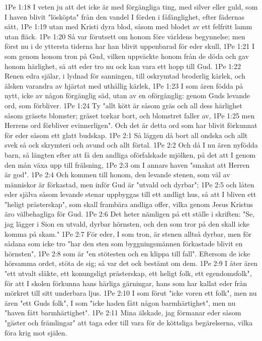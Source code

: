 1Pe 1:18  I veten ju att det icke är med förgängliga ting, med silver eller guld, som I haven blivit "lösköpta" från den vandel I förden i fåfänglighet, efter fädernas sätt,
1Pe 1:19  utan med Kristi dyra blod, såsom med blodet av ett felfritt lamm utan fläck.
1Pe 1:20  Så var förutsett om honom före världens begynnelse; men först nu i de yttersta tiderna har han blivit uppenbarad för eder skull,
1Pe 1:21  I som genom honom tron på Gud, vilken uppväckte honom från de döda och gav honom härlighet, så att eder tro nu ock kan vara ett hopp till Gud.
1Pe 1:22  Renen edra själar, i lydnad för sanningen, till oskrymtad broderlig kärlek, och älsken varandra av hjärtat med uthållig kärlek,
1Pe 1:23  I som ären födda på nytt, icke av någon förgänglig säd, utan av en oförgänglig: genom Guds levande ord, som förbliver.
1Pe 1:24  Ty "allt kött är såsom gräs och all dess härlighet såsom gräsets blomster; gräset torkar bort, och blomstret faller av,
1Pe 1:25  men Herrens ord förbliver evinnerligen". Och det är detta ord som har blivit förkunnat för eder såsom ett glatt budskap.
1Pe 2:1  Så läggen då bort all ondska och allt svek så ock skrymteri och avund och allt förtal.
1Pe 2:2  Och då I nu ären nyfödda barn, så längten efter att få den andliga oförfalskade mjölken, på det att I genom den mån växa upp till frälsning,
1Pe 2:3  om I annars haven "smakat att Herren är god".
1Pe 2:4  Och kommen till honom, den levande stenen, som väl av människor är förkastad, men inför Gud är "utvald och dyrbar";
1Pe 2:5  och låten eder själva såsom levande stenar uppbyggas till ett andligt hus, så att I bliven ett "heligt prästerskap", som skall frambära andliga offer, vilka genom Jesus Kristus äro välbehagliga för Gud.
1Pe 2:6  Det heter nämligen på ett ställe i skriften: "Se, jag lägger i Sion en utvald, dyrbar hörnsten, och den som tror på den skall icke komma på skam."
1Pe 2:7  För eder, I som tron, är stenen alltså dyrbar, men för sådana som icke tro "har den sten som byggningsmännen förkastade blivit en hörnsten",
1Pe 2:8  som är "en stötesten och en klippa till fall". Eftersom de icke hörsamma ordet, stöta de sig; så var det ock bestämt om dem.
1Pe 2:9  I åter ären "ett utvalt släkte, ett konungsligt prästerskap, ett heligt folk, ett egendomsfolk", för att I skolen förkunna hans härliga gärningar, hans som har kallat eder från mörkret till sitt underbara ljus.
1Pe 2:10  I som förut "icke voren ett folk", men nu ären "ett Guds folk", I som "icke haden fått någon barmhärtighet", men nu "haven fått barmhärtighet".
1Pe 2:11  Mina älskade, jag förmanar eder såsom "gäster och främlingar" att taga eder till vara för de köttsliga begärelserna, vilka föra krig mot själen.

